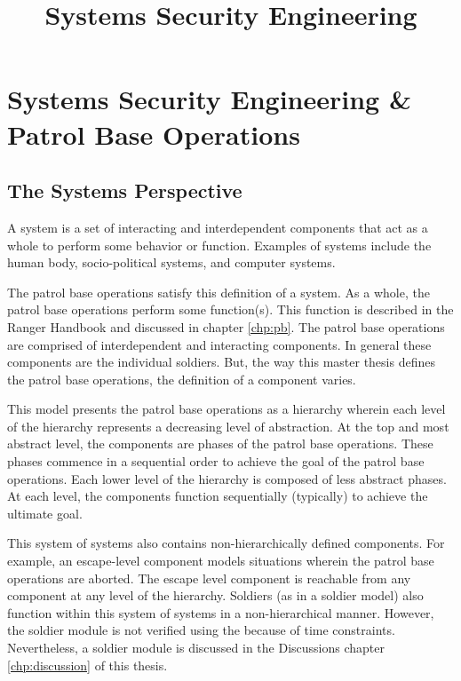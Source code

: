 \documentclass[../../main/main.tex]{subfiles}
\begin{document}
\title{Systems Security Engineering}


\chapter{Systems Security Engineering \& Patrol Base Operations}\label{chp:sse}


\section{The Systems Perspective}\label{sec:systems}
A system is a set of interacting and interdependent components that act as a whole to perform some behavior or function.  Examples of systems include the human body, socio-political systems, and computer systems. 

The patrol base operations satisfy this definition of a system.  As a whole, the patrol base operations perform some function(s).  This function is described in the Ranger Handbook \cite{rangermanual} and discussed in chapter \ref{chp:pb}.  The patrol base operations are comprised of interdependent and interacting components.  In general these components are the individual soldiers.  But, the way this master thesis defines the patrol base operations, the definition of a component varies.


This model presents the patrol base operations as a hierarchy wherein each level of the hierarchy represents a decreasing level of abstraction.  At the top and most abstract level, the components are phases of the patrol base operations.  These phases commence in a sequential order to achieve the goal of the patrol base operations.  Each lower level of the hierarchy is composed of less abstract phases. At each level, the components function sequentially (typically) to achieve the ultimate goal.  

This system of systems also contains non-hierarchically defined components.  For example, an escape-level component models situations wherein the patrol base operations are aborted.  The escape level component is reachable from any component at any level of the hierarchy.  Soldiers (as in a soldier model) also function within this system of systems in a non-hierarchical manner.  However, the soldier module is not verified using the  because of time constraints.   Nevertheless, a soldier module is discussed in the Discussions chapter \ref{chp:discussion} of this thesis.
\end{document}
